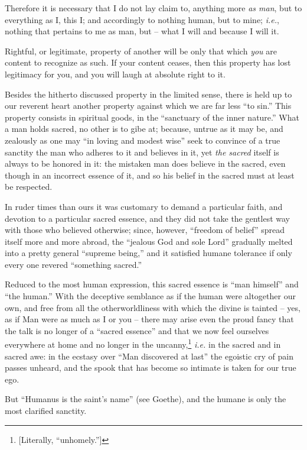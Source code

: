 \documentclass[12pt,a4paper]{book}
\begin{document}
Therefore it is necessary that I do not lay claim to, anything more \textit{as 
man}, but to everything as I, this I; and accordingly to nothing human, but to 
mine; \textit{i.e.}, nothing that pertains to me as man, but -- what I will 
and because I will it.

Rightful, or legitimate, property of another will be only that which 
\textit{you} are content to recognize as such. If your content ceases, then 
this property has lost legitimacy for you, and you will laugh at absolute 
right to it.

Besides the hitherto discussed property in the limited sense, there is held up 
to our reverent heart another property against which we are far less ``to 
sin.'' This property consists in spiritual goods, in the ``sanctuary of the 
inner nature.'' What a man holds sacred, no other is to gibe at; because, 
untrue as it may be, and zealously as one may ``in loving and modest wise'' 
seek to convince of a true sanctity the man who adheres to it and believes in 
it, yet \textit{the sacred} itself is always to be honored in it: the mistaken 
man does believe in the sacred, even though in an incorrect essence of it, and 
so his belief in the sacred must at least be respected.

In ruder times than ours it was customary to demand a particular faith, and 
devotion to a particular sacred essence, and they did not take the gentlest 
way with those who believed otherwise; since, however, ``freedom of belief'' 
spread itself more and more abroad, the ``jealous God and sole Lord'' 
gradually melted into a pretty general ``supreme being,'' and it satisfied 
humane tolerance if only every one revered ``something sacred.''

Reduced to the most human expression, this sacred essence is ``man himself'' 
and ``the human.'' With the deceptive semblance as if the human were 
altogether our own, and free from all the otherworldliness with which the 
divine is tainted -- yes, as if Man were as much as I or you -- there may 
arise even the proud fancy that the talk is no longer of a ``sacred 
essence'' and that we now feel ourselves everywhere at home and no longer in 
the uncanny,\footnote{[Literally, ``unhomely.'']} \textit{i.e.} in the 
sacred and in sacred awe: in the ecstasy over ``Man discovered at last'' the 
egoistic cry of pain passes unheard, and the spook that has become so intimate 
is taken for our true ego.

But ``Humanus is the saint's name'' (see Goethe), and the humane is only the 
most clarified sanctity.
\end{document}
